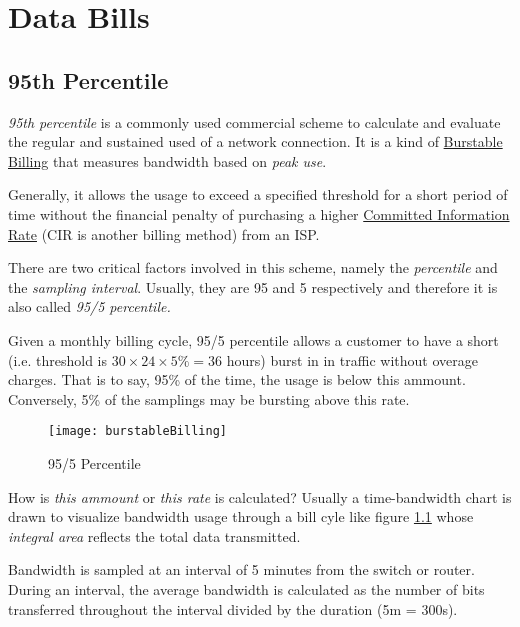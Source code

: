 \chapter{Data Bills}
\label{cha:data-bills}

\section{95th Percentile}
\label{sec:95th-percentile}

\textit{95th percentile} is a commonly used commercial scheme to
calculate and evaluate the regular and sustained used of a network
connection. It is a kind of
\href{https://en.wikipedia.org/wiki/Burstable_billing}{Burstable
  Billing} that measures bandwidth based on \textit{peak use}.

Generally, it allows the usage to exceed a specified threshold for
a short period of time without the financial penalty of purchasing
a higher
\href{https://en.wikipedia.org/wiki/Committed_information_rate}{Committed
  Information Rate} (CIR is another billing method) from an ISP.

There are two critical factors involved in this scheme, namely the
\textit{percentile} and the \textit{sampling interval}. Usually,
they are 95 and 5 respectively and therefore it is also called
\textit{95/5 percentile.}

Given a monthly billing cycle, 95/5 percentile allows a customer
to have a short (i.e. threshold is $30 \times 24 \times 5\% = 36$
hours) burst in in traffic without overage charges. That is to
say, 95\% of the time, the usage is below this
ammount. Conversely, 5\% of the samplings may be bursting above
this rate.

\begin{figure}[!htbp]
  \centering
  \texttt{[image: burstableBilling]}
  \caption{95/5 Percentile}
  \label{fig:95-percentile}
\end{figure}

How is \textit{this ammount} or \textit{this rate} is calculated?
Usually a time-bandwidth chart is drawn to visualize bandwidth
usage through a bill cyle like figure \ref{fig:95-percentile}
whose \textit{integral area} reflects the total data transmitted.

Bandwidth is sampled at an interval of 5 minutes from the switch
or router. During an interval, the average bandwidth is calculated
as the number of bits transferred throughout the interval divided
by the duration (5m = 300s).

